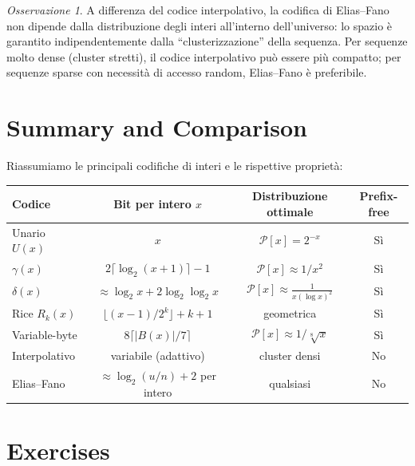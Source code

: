 \documentclass[12pt, a4paper, oneside]{book}
\theoremstyle{plain}
\theoremstyle{definition}
\theoremstyle{remark}
\newtheorem{osservazione}[teorema]{Osservazione}
\begin{document}
\begin{osservazione}
A differenza del codice interpolativo, la codifica di Elias--Fano non dipende dalla distribuzione degli interi all'interno dell'universo: lo spazio è garantito indipendentemente dalla ``clusterizzazione'' della sequenza. Per sequenze molto dense (cluster stretti), il codice interpolativo può essere più compatto; per sequenze sparse con necessità di accesso random, Elias--Fano è preferibile.
\end{osservazione}

\section{Summary and Comparison}
\label{sec:integer-coding-summary}

Riassumiamo le principali codifiche di interi e le rispettive proprietà:

\begin{center}
\begin{tabular}{lccc}
\hline
\textbf{Codice} & \textbf{Bit per intero $x$} & \textbf{Distribuzione ottimale} & \textbf{Prefix-free} \\
\hline
Unario $U(x)$ & $x$ & $\mathcal{P}[x] = 2^{-x}$ & Sì \\
$\gamma(x)$ & $2\lceil\log_2(x+1)\rceil - 1$ & $\mathcal{P}[x] \approx 1/x^2$ & Sì \\
$\delta(x)$ & $\approx \log_2 x + 2\log_2\log_2 x$ & $\mathcal{P}[x] \approx \frac{1}{x(\log x)^2}$ & Sì \\
Rice $R_k(x)$ & $\lfloor(x{-}1)/2^k\rfloor + k + 1$ & geometrica & Sì \\
Variable-byte & $8\lceil|B(x)|/7\rceil$ & $\mathcal{P}[x] \approx 1/\sqrt[8]{x}$ & Sì \\
Interpolativo & variabile (adattivo) & cluster densi & No \\
Elias--Fano & $\approx \log_2(u/n) + 2$ per intero & qualsiasi & No \\
\hline
\end{tabular}
\end{center}

\section{Exercises}
\end{document}

